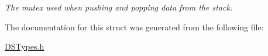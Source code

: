 \begin{DoxyCompactItemize}
\begin{DoxyCompactList}\small\item\em The mutex used when pushing and popping data from the stack. \item\end{DoxyCompactList}\end{DoxyCompactItemize}


The documentation for this struct was generated from the following file:\begin{DoxyCompactItemize}
\item 
\hyperlink{_d_s_types_8h}{DSTypes.h}\end{DoxyCompactItemize}
